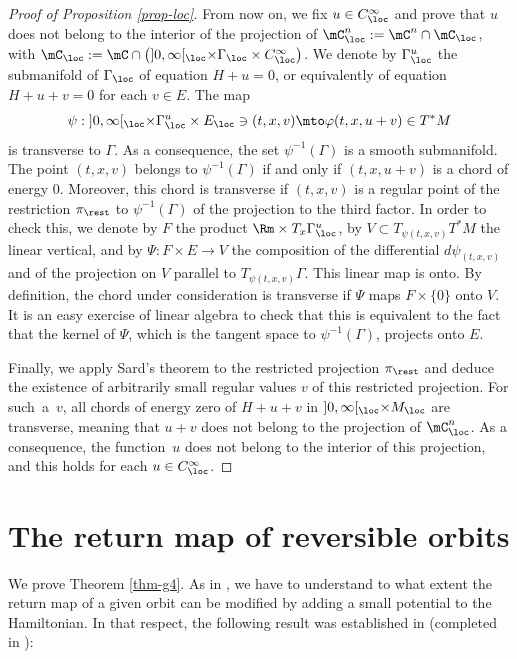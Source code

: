 \begin{proof}[Proof of Proposition \ref{prop-loc}]
From now on, we fix $u\in C^{\infty}_{\loc}$ and prove that $u$ does not belong to the interior of the projection
of $\mC^n_{\loc}:=\mC^n \cap \mC_{\loc}$, with $\mC_{\loc}:=\mC\cap \big(]0, \infty[_{\loc}\times \Gamma_{\loc}\times C^{\infty}_{\loc}\big)$.
We denote by $\Gamma^u_{\loc}$ the submanifold
of $\Gamma_{\loc}$ of equation $H+u=0$, or equivalently of equation $H+u+v=0$ for each $v\in E$.
The map
\[
\psi:{} ]0, \infty[_{\loc}\times \Gamma^u_{\loc}\times E_{\loc}\ni (t,x,v)\mto \varphi(t, x, u+v) \in T^*M
\]
is transverse to $\Gamma$.
As a consequence, the set
$\psi^{-1}(\Gamma)$ is a smooth submanifold.
The point $(t,x,v)$ belongs to $\psi^{-1}(\Gamma)$ if and only if $(t,x,u+v)$ is a chord of energy $0$.
Moreover, this chord is transverse if $(t,x,v)$ is a regular point of the restriction $\pi_{\rest}$ to $\psi^{-1}(\Gamma)$
of the projection to the third factor.
In order to check this, we denote by $F$ the product $\Rm\times T_x\Gamma^u_{\loc}$, by $V\subset T_{\psi(t,x,v)}T^*M$ the linear vertical,
and by $\Psi:F\times E\to V$ the composition of the differential $d\psi_{(t,x,v)}$ and of the projection on $V$ parallel to $T_{\psi(t,x,v)}\Gamma$. This linear map is onto.
By definition, the chord under consideration is transverse if $\Psi$ maps $F\times \{0\}$ onto $V$. It is an easy exercise of linear algebra
to check that this is equivalent to the fact that the kernel of $\Psi$, which is the tangent space to $\psi^{-1}(\Gamma)$, projects onto $E$.

Finally, we apply Sard's theorem to the restricted projection $\pi_{\rest}$ and deduce the existence of arbitrarily small regular values $v$ of this
restricted projection. For such~a~$v$, all chords of energy zero of $H+u+v$ in $]0, \infty[_{\loc}\times M_{\loc}$ are transverse,
meaning that $u+v$ does not belong to the projection of $\mC^n_{\loc}$. As a consequence, the function~$u$ does not belong to the interior of this projection, and this holds for each $u\in C^{\infty}_{\loc}$.
\end{proof}

\section{The return map of reversible orbits}\label{sec-rmr}

We prove Theorem \ref{thm-g4}.
As in \cite{O08,RR}, we have to understand to what extent
the return map of a given orbit can be modified by adding a small potential to the Hamiltonian.
In that respect, the following result was established in \cite{RR} (completed in \cite{AB}):

